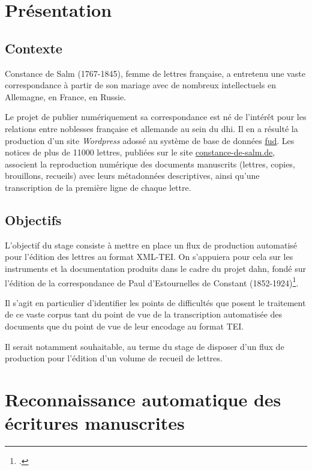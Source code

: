 \documentclass[a4paper,12pt,twoside]{book}
\begin{document}
	
	\tableofcontents
	
	\chapter*{Présentation}
	
		\section*{Contexte}
		Constance de Salm (1767-1845), femme de lettres française, a entretenu une vaste correspondance à partir de son mariage avec de nombreux intellectuels en Allemagne, en France, en Russie.

		Le projet de publier numériquement sa correspondance est né de l'intérêt pour les relations entre noblesses française et allemande au sein du \gls{dhi}. Il en a résulté la production d'un site \textit{Wordpress} adossé au système de base de données \href{https://fud.uni-trier.de/}{\gls{fud}}. Les notices de plus de 11000 lettres, publiées sur le site \href{https://constance-de-salm.de}{constance-de-salm.de}, associent la reproduction numérique des documents manuscrits (lettres, copies, brouillons, recueils) avec leurs métadonnées descriptives, ainsi qu'une transcription de la première ligne de chaque lettre.

		\section*{Objectifs}
		L'objectif du stage consiste à mettre en place un flux de production automatisé pour l'édition des lettres au format XML-TEI. On s'appuiera pour cela sur les instruments et la documentation produits dans le cadre du projet \gls{dahn}, fondé sur l'édition de la correspondance de Paul d’Estournelles de Constant (1852-1924)\footcite{chiffoleauDAHNProject}.
		
		Il s'agit en particulier d'identifier les points de difficultés que posent le traitement de ce vaste corpus tant du point de vue de la transcription automatisée des documents que du point de vue de leur encodage au format TEI. 
		
		Il serait notamment souhaitable, au terme du stage de disposer d'un flux de production pour l'édition d'un volume de recueil de lettres.
			
	\chapter{Reconnaissance automatique des écritures manuscrites}
		
\end{document}
